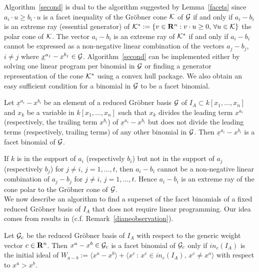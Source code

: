 \documentclass[11pt]{article}
\begin{document}
Algorithm~\ref{second} is dual to the algorithm suggested by
Lemma~\ref{facets} since $a_i \cdot u \geq b_i  
\cdot u$ is a facet inequality of the Gr\"obner cone ${\cal K}$ 
of ${\cal G}$ if and only if $a_i - b_i$ is an extreme
ray (essential generator) of ${\cal K}^{\ast} := \{ v \in {\bf R}^n :
v \cdot u \geq 0, \, \forall u \in {\cal K}\}$ the polar cone of
${\cal K}$. The vector $a_i - b_i$ is an extreme ray of ${\cal
K}^{\ast}$ if and only if  
$a_i - b_i$ cannot be expressed as a non-negative linear combination 
of the vectors $a_j - b_j$, $i \neq j$ where ${\underline
x^{a_j}}-x^{b_j} \in {\cal G}$. Algorithm~\ref{second} can be
implemented either by solving one linear program per binomial in
${\cal G}$ or finding a generator representation of the cone ${\cal
K}^{\ast}$ using a convex hull package. We also obtain an easy
sufficient condition for a binomial in ${\cal G}$ to be a facet binomial.

\begin{lemma}
Let ${\underline x^{a_i}}-x^{b_i}$ be an element of a reduced
Gr\"obner basis ${\cal G}$ of $I_A \subset k[x_1, \ldots, x_n]$ and
$x_k$ be a variable in $k[x_1, \ldots, x_n]$ such that $x_k$ divides
the leading term $x^{a_i}$ (respectively, the trailing term $x^{b_i}$)
of ${\underline x^{a_i}}-x^{b_i}$ but does not divide the leading terms
(respectively, trailing terms) of any other binomial in ${\cal G}$. 
Then ${\underline x^{a_i}}-x^{b_i}$ is a facet binomial of ${\cal G}$.
\end{lemma}

 If $k$ is in the support of $a_i$ (respectively
$b_i$) but not in the support of $a_j$ (respectively $b_j$) for $j
\neq i$, $j = 1,\ldots,t$, then $a_i - b_i$ cannot be a non-negative
linear combination of $a_j - b_j$ for $j \neq i$, $j =
1,\ldots,t$. Hence $a_i - b_i$ is an extreme ray of the cone polar to
the Gr\"obner cone of ${\cal G}$.\\

We now describe an algorithm to find a superset of the facet binomials 
of a fixed reduced Gr\"obner basis of $I_A$ that does not require 
linear programming. Our idea comes from results in \cite{MT}
(c.f. Remark~\ref{dianeobservation}). 

\begin{theorem} \cite{MT} \label{flippability}
Let ${\cal G}_c$ be the reduced Gr\"obner basis of
$I_A$ with respect to the generic weight vector $c \in {\bf R}^n$. 
Then $x^a - x^b \in {\cal G}_c$ is a facet binomial of ${\cal G}_c$
only if $in_c(I_A)$ is the initial ideal of $W_{a-b} := \langle x^a - 
x^b \rangle + \langle x^c \, : \, x^c \in in_c(I_A), \, x^c \neq x^a
\rangle$ with respect to $x^a > x^b$. 
\end{theorem}
\end{document}
